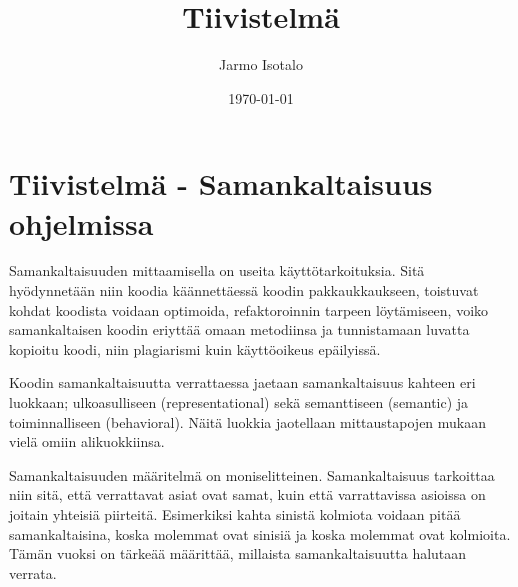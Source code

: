 \documentclass[finnish]{tktltiki2}
\title{Tiivistelmä}
\author{Jarmo Isotalo}
\date{\today}
\theoremstyle{definition}
\theoremstyle{remark}
\begin{document}

\frontmatter      %

\maketitle        %


\mainmatter
\section{Tiivistelmä - Samankaltaisuus ohjelmissa}

Samankaltaisuuden mittaamisella on useita käyttötarkoituksia. Sitä hyödynnetään niin koodia käännettäessä koodin pakkaukkaukseen, toistuvat kohdat koodista voidaan optimoida, refaktoroinnin tarpeen löytämiseen, voiko samankaltaisen koodin eriyttää omaan metodiinsa ja tunnistamaan luvatta kopioitu koodi, niin plagiarismi kuin käyttöoikeus epäilyissä.

Koodin samankaltaisuutta verrattaessa jaetaan samankaltaisuus kahteen eri luokkaan; ulkoasulliseen (representational) sekä semanttiseen (semantic) ja toiminnalliseen (behavioral). Näitä luokkia jaotellaan mittaustapojen mukaan vielä omiin alikuokkiinsa.

Samankaltaisuuden määritelmä on moniselitteinen. Samankaltaisuus tarkoittaa niin sitä, että verrattavat asiat ovat samat, kuin että varrattavissa asioissa on joitain yhteisiä piirteitä. Esimerkiksi kahta sinistä kolmiota voidaan pitää samankaltaisina, koska molemmat ovat sinisiä ja koska molemmat ovat kolmioita. Tämän vuoksi on tärkeää määrittää, millaista samankaltaisuutta halutaan verrata.
\end{document}
